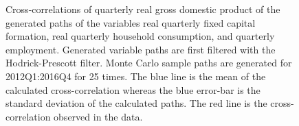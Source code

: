 \begin{figure}[!h]
    \centering
      
    \caption{Cross-correlations of quarterly real gross domestic product of the generated paths of the variables real quarterly fixed capital formation, real quarterly household consumption, and quarterly employment. Generated variable paths are first filtered with the Hodrick-Prescott filter. Monte Carlo sample paths are generated for 2012Q1:2016Q4 for 25 times. The blue line is the mean of the calculated cross-correlation whereas the blue error-bar is the standard deviation of the calculated paths. The red line is the cross-correlation observed in the data.}
    \label{fig:crosscorr-abm}
\end{figure}


